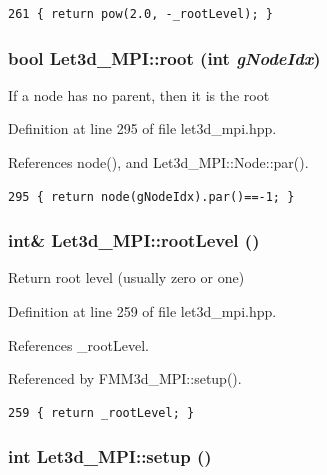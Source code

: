 \footnotesize\begin{verbatim}261 { return pow(2.0, -_rootLevel); }
\end{verbatim}\normalsize 


\subsubsection{\setlength{\rightskip}{0pt plus 5cm}bool Let3d\_\-MPI::root (int {\em g\-Node\-Idx})\hspace{0.3cm}{\tt  [inline]}}\label{classLet3d__MPI_06ef4c5a5a60303ba9b0b041a8bb5000_06ef4c5a5a60303ba9b0b041a8bb5000}


If a node has no parent, then it is the root 

Definition at line 295 of file let3d\_\-mpi.hpp.

References node(), and Let3d\_\-MPI::Node::par().

\footnotesize\begin{verbatim}295 { return node(gNodeIdx).par()==-1; }
\end{verbatim}\normalsize 


\subsubsection{\setlength{\rightskip}{0pt plus 5cm}int\& Let3d\_\-MPI::root\-Level ()\hspace{0.3cm}{\tt  [inline]}}\label{classLet3d__MPI_f80fcb36cb42936f1912fe8c85ec96e4_f80fcb36cb42936f1912fe8c85ec96e4}


Return root level (usually zero or one) 

Definition at line 259 of file let3d\_\-mpi.hpp.

References \_\-root\-Level.

Referenced by FMM3d\_\-MPI::setup().

\footnotesize\begin{verbatim}259 { return _rootLevel; }
\end{verbatim}\normalsize 


\subsubsection{\setlength{\rightskip}{0pt plus 5cm}int Let3d\_\-MPI::setup ()}\label{classLet3d__MPI_415266b005d267e801176f27c0434a50_415266b005d267e801176f27c0434a50}


